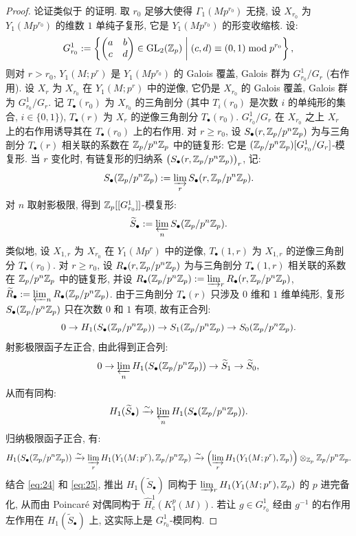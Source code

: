 \begin{proof}
论证类似于 \cite[Th.~2.1.12]{ref:24} 的证明.
取 $r_0$ 足够大使得 $\Gamma_1(Mp^{r_0})$ 无挠, 设 $X_{r_0}$ 为 $Y_1(Mp^{r_0})$ 的维数 $1$ 单纯子复形, 它是 $Y_1(Mp^{r_0})$ 的形变收缩核.
设:
\[
G_{r_0}^{1} := \left\{ \begin{pmatrix} a & b \\ c & d \end{pmatrix} \in \mathrm{GL}_2(\mathbb{Z}_p) \;\middle|\; (c,d) \equiv (0,1) \bmod p^{r_0} \right\},
\]
则对 $r > r_0$, $Y_1(M;p^{r})$ 是 $Y_1(Mp^{r_0})$ 的 Galois 覆盖, Galois 群为 $G_{r_0}^{1}/G_r$ (右作用).
设 $X_r$ 为 $X_{r_0}$ 在 $Y_1(M;p^{r})$ 中的逆像, 它仍是 $X_{r_0}$ 的 Galois 覆盖, Galois 群为 $G_{r_0}^{1}/G_r$.
记 $T_{\bullet}(r_0)$ 为 $X_{r_0}$ 的三角剖分 (其中 $T_i(r_0)$ 是次数 $i$ 的单纯形的集合, $i \in \{0,1\}$), $T_{\bullet}(r)$ 为 $X_r$ 的逆像三角剖分 $T_{\bullet}(r_0)$.
$G_{r_0}^{1}/G_r$ 在 $X_{r_0}$ 之上 $X_r$ 上的右作用诱导其在 $T_{\bullet}(r_0)$ 上的右作用.
对 $r \ge r_0$, 设 $S_{\bullet}(r,\mathbb{Z}_p/p^{n}\mathbb{Z}_p)$ 为与三角剖分 $T_{\bullet}(r)$ 相关联的系数在 $\mathbb{Z}_p/p^{n}\mathbb{Z}_p$ 中的链复形: 它是 $(\mathbb{Z}_p/p^{n}\mathbb{Z}_p)[G_{r_0}^{1}/G_r]$-模复形.
当 $r$ 变化时, 有链复形的归纳系 $\bigl(S_{\bullet}(r,\mathbb{Z}_p/p^{n}\mathbb{Z}_p)\bigr)_r$, 记:
\[
S_{\bullet}(\mathbb{Z}_p/p^{n}\mathbb{Z}_p) := \varinjlim_r S_{\bullet}(r,\mathbb{Z}_p/p^{n}\mathbb{Z}_p).
\]
对 $n$ 取射影极限, 得到 $\mathbb{Z}_p[[G_{r_0}^{1}]]$-模复形:
\[
\widetilde{S}_{\bullet} := \varprojlim_n S_{\bullet}(\mathbb{Z}_p/p^{n}\mathbb{Z}_p).
\]
类似地, 设 $X_{1,r}$ 为 $X_{r_0}$ 在 $Y_1(Mp^{r})$ 中的逆像, $T_{\bullet}(1,r)$ 为 $X_{1,r}$ 的逆像三角剖分 $T_{\bullet}(r_0)$.
对 $r \ge r_0$, 设 $R_{\bullet}(r,\mathbb{Z}_p/p^{n}\mathbb{Z}_p)$ 为与三角剖分 $T_{\bullet}(1,r)$ 相关联的系数在 $\mathbb{Z}_p/p^{n}\mathbb{Z}_p$ 中的链复形, 并设 $R_{\bullet}(\mathbb{Z}_p/p^{n}\mathbb{Z}_p) := \varinjlim_r R_{\bullet}(r,\mathbb{Z}_p/p^{n}\mathbb{Z}_p)$, $\widetilde{R}_{\bullet} := \varprojlim_n R_{\bullet}(\mathbb{Z}_p/p^{n}\mathbb{Z}_p)$.
由于三角剖分 $T_{\bullet}(r)$ 只涉及 $0$ 维和 $1$ 维单纯形, 复形 $S_{\bullet}(\mathbb{Z}_p/p^{n}\mathbb{Z}_p)$ 只在次数 $0$ 和 $1$ 有项, 故有正合列:
\[
0 \to H_1(S_{\bullet}(\mathbb{Z}_p/p^{n}\mathbb{Z}_p)) \to S_1(\mathbb{Z}_p/p^{n}\mathbb{Z}_p) \to S_0(\mathbb{Z}_p/p^{n}\mathbb{Z}_p).
\]
射影极限函子左正合, 由此得到正合列:
\[
0 \to \varprojlim_n H_1(S_{\bullet}(\mathbb{Z}_p/p^{n}\mathbb{Z}_p)) \to \widetilde{S}_1 \to \widetilde{S}_0,
\]
从而有同构:
\begin{equation}
\label{eq:24}
H_1(\widetilde{S}_{\bullet}) \xrightarrow{\sim} \varprojlim_n H_1(S_{\bullet}(\mathbb{Z}_p/p^{n}\mathbb{Z}_p)).
\end{equation}
归纳极限函子正合, 有:
\begin{equation}
\label{eq:25}
H_1(S_{\bullet}(\mathbb{Z}_p/p^{n}\mathbb{Z}_p)) \xrightarrow{\sim} \varinjlim_r H_1(Y_1(M;p^{r}),\mathbb{Z}_p/p^{n}\mathbb{Z}_p) \xrightarrow{\sim} \Bigl(\varinjlim_r H_1(Y_1(M;p^{r}),\mathbb{Z}_p)\Bigr) \otimes_{\mathbb{Z}_p} \mathbb{Z}_p/p^{n}\mathbb{Z}_p.
\end{equation}
结合 \eqref{eq:24} 和 \eqref{eq:25}, 推出 $H_1(\widetilde{S}_{\bullet})$ 同构于 $\varinjlim_r H_1(Y_1(M;p^{r}),\mathbb{Z}_p)$ 的 $p$ 进完备化, 从而由 Poincar\'e 对偶同构于 $\widehat{H}_{c}^{1}(K_1^{p}(M))$.
若让 $g \in G_{r_0}^{1}$ 经由 $g^{-1}$ 的右作用左作用在 $H_1(\widetilde{S}_{\bullet})$ 上, 这实际上是 $G_{r_0}^{1}$-模同构.


\end{proof}
